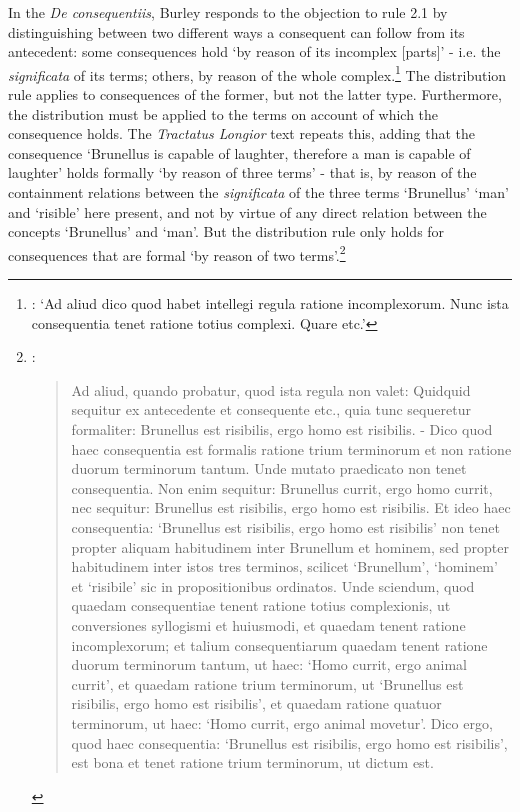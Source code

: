 \documentclass[]{birkjour}
\begin{document}
In the \textit{De consequentiis}, Burley responds to the objection to rule 2.1 by distinguishing between two different ways a consequent can follow from its antecedent: some consequences hold `by reason of its incomplex [parts]' - i.e. the \textit{significata} of its terms; others, by reason of the whole complex.\footnote{\autocite[p. 118, par. 31]{Green-Pedersen1980b}: `Ad aliud dico quod habet intellegi regula ratione incomplexorum. Nunc ista consequentia tenet ratione totius complexi. Quare etc.'} The distribution rule applies to consequences of the former, but not the latter type. Furthermore, the distribution must be applied to the terms on account of which the consequence holds. The \textit{Tractatus Longior} text repeats this, adding that the consequence `Brunellus is capable of laughter, therefore a man is capable of laughter' holds formally `by reason of three terms' - that is, by reason of the containment relations between the \textit{significata} of the three terms `Brunellus' `man' and `risible' here present, and not by virtue of any direct relation between the concepts `Brunellus' and `man'. But the distribution rule only holds for consequences that are formal `by reason of two terms'.\footnote{\autocite[pp. 84.11-85.17]{BurleyDPAL}: \begin{quote}
		Ad aliud, quando probatur, quod ista regula non valet: Quidquid sequitur ex antecedente et consequente etc., quia tunc sequeretur formaliter: Brunellus est risibilis, ergo homo est risibilis. - Dico quod haec consequentia est formalis ratione trium terminorum et non ratione duorum terminorum tantum. Unde mutato praedicato non tenet consequentia. Non enim sequitur: Brunellus currit, ergo homo currit, nec sequitur: Brunellus est risibilis, ergo homo est risibilis. Et ideo haec consequentia: `Brunellus est risibilis, ergo homo est risibilis' non tenet propter aliquam habitudinem inter Brunellum et hominem, sed propter habitudinem inter istos tres terminos, scilicet `Brunellum', `hominem' et `risibile' sic in propositionibus ordinatos. Unde sciendum, quod quaedam consequentiae tenent ratione totius complexionis, ut conversiones syllogismi et huiusmodi, et quaedam tenent ratione incomplexorum; et talium consequentiarum quaedam tenent ratione duorum terminorum tantum, ut haec: `Homo currit, ergo animal currit', et quaedam ratione trium terminorum, ut `Brunellus est risibilis, ergo homo est risibilis', et quaedam ratione quatuor terminorum, ut haec: `Homo currit, ergo animal movetur'. Dico ergo, quod haec consequentia: `Brunellus est risibilis, ergo homo est risibilis', est bona et tenet ratione trium terminorum, ut dictum est.


\end{quote}}
\end{document}
